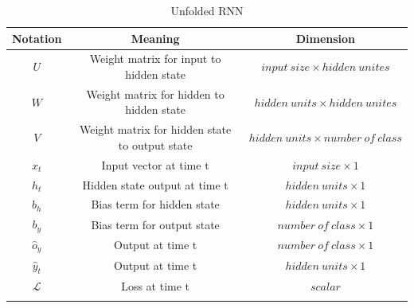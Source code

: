 \documentclass[12pt,a4paper]{article}
\begin{document}
\newpage
\begin{longtable}{|c|c|c|}
    \hline
    \textbf{Notation} & \textbf{Meaning} & \textbf{Dimension}\\
    \hline
    $U$          & Weight matrix for input to hidden state       & $input\ size\times hidden\ unites$\\
    $W$          & Weight matrix for hidden to hidden state      & $hidden\ units\times hidden\ unites$\\
    $V$          & Weight matrix for hidden state to output state& $hidden\ units\times number\ of\ class$\\
    $x_t$        & Input vector at time t                        & $input\ size\times 1$\\
    $h_t$        & Hidden state output at time t                 & $hidden\ units\times 1$\\
    $b_h$        & Bias term for hidden state                    & $hidden\ units\times 1$\\
    $b_y$        & Bias term for output state                    & $number\ of\ class\times 1$\\
    $\hat{o}_y$  & Output at time t                              & $number\ of\ class\times 1$\\
    $\hat{y}_t$  & Output at time t                              & $hidden\ units\times 1$\\
    $\mathcal{L}$& Loss at time t                                & $scalar$\\
    \hline
    \caption{Unfolded RNN}
\end{longtable}
\end{document}
